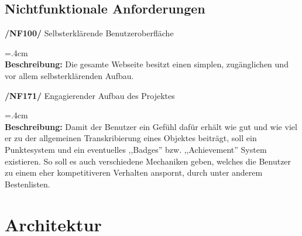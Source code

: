 \documentclass{article}
\newenvironment{funcD}{\vspace{-.6cm}\\\par\begingroup\leftskip=.4cm\noindent\\}{\\\par\endgroup\noindent}
\begin{document}
\subsection*{Nichtfunktionale Anforderungen}
\textbf{/NF100/} Selbsterklärende Benutzeroberfläche
\begin{funcD}
    \textbf{Beschreibung:} Die gesamte Webseite besitzt einen simplen, zugänglichen und vor allem selbsterklärenden Aufbau. 
\end{funcD}
\textbf{/NF171/} Engagierender Aufbau des Projektes
\begin{funcD}
    \textbf{Beschreibung:} Damit der Benutzer ein Gefühl dafür erhält wie gut und wie viel er zu der allgemeinen Transkribierung eines Objektes beiträgt, soll ein Punktesystem und ein eventuelles ,,Badges'' bzw. ,,Achievement'' System existieren. So soll es auch verschiedene Mechaniken geben, welches die Benutzer zu einem eher kompetitiveren Verhalten anspornt, durch unter anderem Bestenlisten.
\end{funcD}

\section{Architektur}
\end{document}
